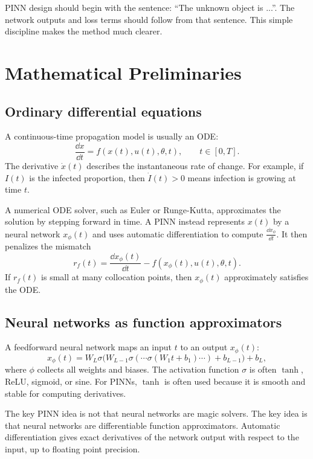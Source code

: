 \documentclass[11pt,a4paper]{article}
\begin{document}
\begin{takeaway}
PINN design should begin with the sentence: ``The unknown object is ...''. The network outputs and loss terms should follow from that sentence. This simple discipline makes the method much clearer.
\end{takeaway}

\section{Mathematical Preliminaries}

\subsection{Ordinary differential equations}
A continuous-time propagation model is usually an ODE:
\begin{equation}
    \frac{\dd x}{\dd t}=f(x(t),u(t),\theta,t), \qquad t\in[0,T].
\end{equation}
The derivative $\dot{x}(t)$ describes the instantaneous rate of change. For example, if $I(t)$ is the infected proportion, then $\dot{I}(t)>0$ means infection is growing at time $t$.

A numerical ODE solver, such as Euler or Runge-Kutta, approximates the solution by stepping forward in time. A PINN instead represents $x(t)$ by a neural network $x_\phi(t)$ and uses automatic differentiation to compute $\frac{\dd x_\phi}{\dd t}$. It then penalizes the mismatch
\begin{equation}
    r_f(t)=\frac{\dd x_\phi(t)}{\dd t}-f(x_\phi(t),u(t),\theta,t).
\end{equation}
If $r_f(t)$ is small at many collocation points, then $x_\phi(t)$ approximately satisfies the ODE.

\subsection{Neural networks as function approximators}
A feedforward neural network maps an input $t$ to an output $x_\phi(t)$:
\begin{equation}
    x_\phi(t)=W_L \sigma\big(W_{L-1}\sigma(\cdots \sigma(W_1 t+b_1)\cdots)+b_{L-1}\big)+b_L,
\end{equation}
where $\phi$ collects all weights and biases. The activation function $\sigma$ is often $\tanh$, ReLU, sigmoid, or sine. For PINNs, $\tanh$ is often used because it is smooth and stable for computing derivatives.

The key PINN idea is not that neural networks are magic solvers. The key idea is that neural networks are differentiable function approximators. Automatic differentiation gives exact derivatives of the network output with respect to the input, up to floating point precision.
\end{document}
